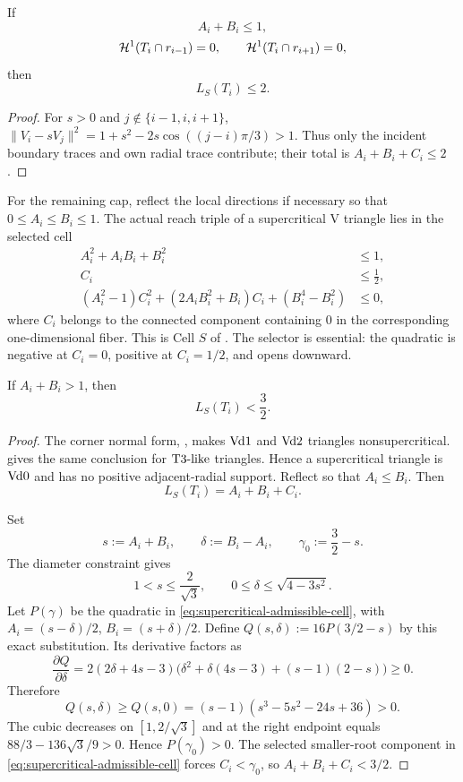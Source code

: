\begin{lemma}
\label{lem:no-support-skeleton-cap}
If
\[
 A_i+B_i\le1,
\]
\[
 \mathcal H^1(T_i\cap r_{i-1})=0,
 \qquad \mathcal H^1(T_i\cap r_{i+1})=0,
\]
then
\[
 L_S(T_i)\le2.
\]
\end{lemma}

\begin{proof}
For $s>0$ and $j\notin\{i-1,i,i+1\}$,
$\|V_i-sV_j\|^2=1+s^2-2s\cos((j-i)\pi/3)>1$.
Thus only the incident boundary traces and own radial trace contribute;
their total is $A_i+B_i+C_i\le2$.
\end{proof}

For the remaining cap, reflect the local directions if necessary so that
$0\le A_i\le B_i\le1$.  The actual reach triple of a supercritical V
triangle lies in the selected cell
\begin{equation}
\begin{aligned}
 A_i^2+A_iB_i+B_i^2&\le1,\\
 C_i&\le\frac12,\\
 (A_i^2-1)C_i^2+(2A_iB_i^2+B_i)C_i+(B_i^4-B_i^2)&\le0,
\end{aligned}
\label{eq:supercritical-admissible-cell}
\end{equation}
where $C_i$ belongs to the connected component containing $0$ in the
corresponding one-dimensional fiber.  This is Cell $S$ of
.  The selector is essential: the
quadratic is negative at $C_i=0$, positive at $C_i=1/2$, and opens downward.

\begin{lemma}
\label{lem:supercritical-skeleton-cap}
\label{lem:app-supercritical-skeleton-calculation}

If $A_i+B_i>1$, then
\[
 L_S(T_i)<\frac32.
\]
\end{lemma}
\begin{proof}
The corner normal form, , makes
$\mathrm{Vd1}$ and $\mathrm{Vd2}$ triangles nonsupercritical.   gives the same conclusion for $\mathrm{T3\text{-}like}$
triangles.  Hence a supercritical triangle is $\mathrm{Vd0}$ and has no positive
adjacent-radial support.  Reflect so that $A_i\le B_i$.
Then
\[
 L_S(T_i)=A_i+B_i+C_i.
\]

Set
\[
 s:=A_i+B_i,\qquad \delta:=B_i-A_i,
 \qquad \gamma_0:=\frac32-s.
\]
The diameter constraint gives
\[
 1<s\le\frac2{\sqrt3},
 \qquad0\le\delta\le\sqrt{4-3s^2}.
\]
Let $P(\gamma)$ be the quadratic in
\eqref{eq:supercritical-admissible-cell}, with
$A_i=(s-\delta)/2$, $B_i=(s+\delta)/2$. Define
$Q(s,\delta):=16P(3/2-s)$ by this exact substitution.
Its derivative factors as
\[
 \frac{\partial Q}{\partial\delta}
 =2(2\delta+4s-3)
 \bigl(\delta^2+\delta(4s-3)+(s-1)(2-s)\bigr)\ge0.
\]
Therefore
\[
 Q(s,\delta)\ge Q(s,0)
 =(s-1)(s^3-5s^2-24s+36)>0.
\]
The cubic decreases on $[1,2/\sqrt3]$ and at the right endpoint equals
$88/3-136\sqrt3/9>0$.  Hence $P(\gamma_0)>0$.  The selected smaller-root
component in \eqref{eq:supercritical-admissible-cell} forces
$C_i<\gamma_0$, so $A_i+B_i+C_i<3/2$.
\end{proof}

